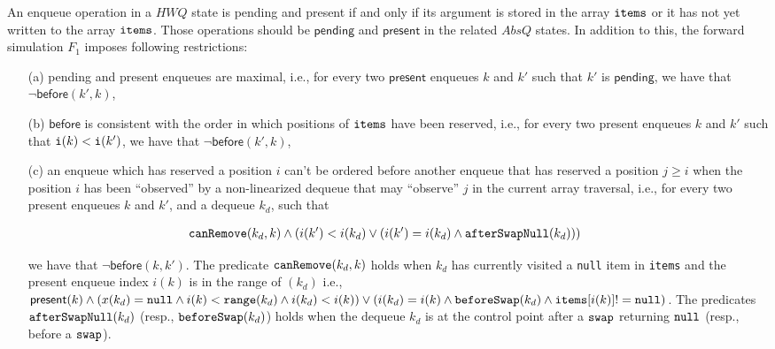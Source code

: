 An enqueue operation in a $\mathit{HWQ}$ state is pending and present if and only if its argument is stored in the array ${\tt items}$ or it has not yet written to the array  ${\tt items}$. Those operations should be $\mathsf{pending}$ and $\mathsf{present}$ in the related $AbsQ$ states. In addition to this, the forward simulation $F_1$ imposes following restrictions:
\vspace{-2mm}
\begin{itemize}
	\item[(a)] pending and present enqueues are maximal, i.e., for every two $\mathsf{present}$ enqueues $k$ and $k'$ such that $k'$ is $\mathsf{pending}$, we have that $\neg \mathsf{before}(k',k)$, %
	\item[(b)] $\mathsf{before}$ is consistent with the order in which positions of ${\tt items}$ have been reserved, i.e., for every two present enqueues $k$ and $k'$ such that ${\tt i}(k) < {\tt i}(k')$, we have that $\neg \mathsf{before}(k',k)$, %
	\item[(c)] an enqueue which has reserved a position $i$ %
	can't be ordered before another enqueue that has reserved a position $j \geq i$ when the position $i$ has been ``observed'' by a non-linearized dequeue that may ``observe'' $j$ in the current array traversal, i.e., for every two present enqueues $k$ and $k'$, and a dequeue $k_d$, such that 
	
	\vspace{-2mm}
	\noindent
	{\small
	\begin{align}
	\hspace{-8mm}
	{\tt canRemove}(k_d,k) \land (i(k') < i(k_d) \lor (i(k')=i(k_d) \land {\tt afterSwapNull}(k_d)))
\label{eq:inst}
	\end{align}}
	
	\vspace{-6mm}
	\noindent
	we have that $\neg \mathsf{before}(k,k')$. The predicate ${\tt canRemove}(k_d,k)$ holds when $k_d$ has currently visited a {\tt null} item in {\tt items} and the present enqueue index $i(k)$ is in the range of $(k_d)$ i.e., $\mathsf{present}(k) \land (x(k_d) = {\tt null} \land i(k) < {\tt range}(k_d) \land i(k_d) < i(k)) \lor (i(k_d) = i(k) \land {\tt beforeSwap}(k_d) \land {\tt items}[i(k)] != {\tt null})$. The predicates ${\tt afterSwapNull}(k_d)$ (resp., ${\tt beforeSwap}(k_d)$) holds when the dequeue $k_d$ is at the control point after a ${\tt swap}$ returning ${\tt null}$ (resp., before a ${\tt swap}$). 
\vspace{-2mm}
\end{itemize}

